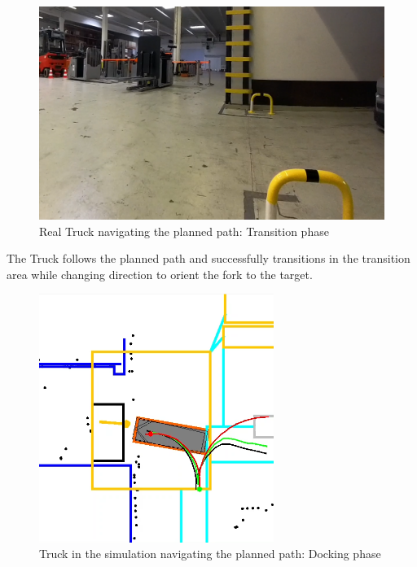 \begin{figure}[H]
    \begin{center}
        \includegraphics[width=5in]{images/Chap3/Test1_real_transition.png} %
        \caption{Real Truck navigating the planned path: Transition phase}
        \label{OptResult51}
        \end{center}    
\end{figure}

The Truck follows the planned path and successfully 
transitions in the transition area while changing direction to orient the 
fork to the target.

\begin{figure}[H]
    \begin{center}
        \includegraphics[width=3in]{images/Chap3/Test1_dock.png} %
        \caption{Truck in the simulation navigating the planned path: Docking phase}
        \label{OptResult60}
        \end{center}    
\end{figure}


